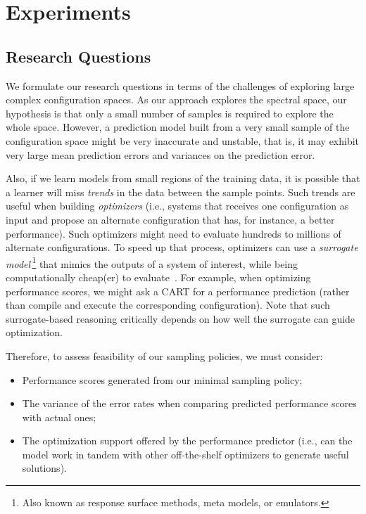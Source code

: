 \documentclass[smallextended]{svjour3}       %
\begin{document}
\section{Experiments}
\label{sec:experiments}



\subsection{Research Questions} 

We formulate our research questions in terms of the challenges of
exploring large complex configuration spaces.
As our approach explores the spectral space, our hypothesis is that only a small
number of samples is required to explore the whole space.
However, a prediction model built from a very small sample of the configuration space might
be very inaccurate and unstable, that is, it may exhibit very large mean prediction errors and variances on the prediction error.

Also, if we learn models from small regions of the training data,
it is  possible that a learner will miss {\em trends} in the data
between the sample points. Such trends are useful when building {\em optimizers}
(i.e., systems that receives one configuration as input and propose an alternate
configuration that has, for instance,  a better performance). Such optimizers might
need to evaluate hundreds to millions of alternate configurations. 
To speed up that process, optimizers can use a {\em surrogate model}\,\footnote{Also known as response surface methods, meta models, or emulators.}
that  mimics the outputs of a system of interest, while being computationally cheap(er) to evaluate~\cite{loshchilov13}. For example, when optimizing
performance scores, we might ask a CART  for a performance
prediction (rather than compile and execute
the corresponding configuration).  Note that such surrogate-based
reasoning critically depends on how well the surrogate can guide optimization.


Therefore, to assess feasibility of our sampling policies, we must consider:
\begin{itemize}
\item Performance scores generated from our minimal sampling policy;
\item The variance of the error rates when comparing predicted performance scores with actual ones;
\item The optimization support offered by the performance predictor (i.e., can the model work in tandem with other off-the-shelf optimizers to generate useful solutions).
\end{itemize}
\end{document}
